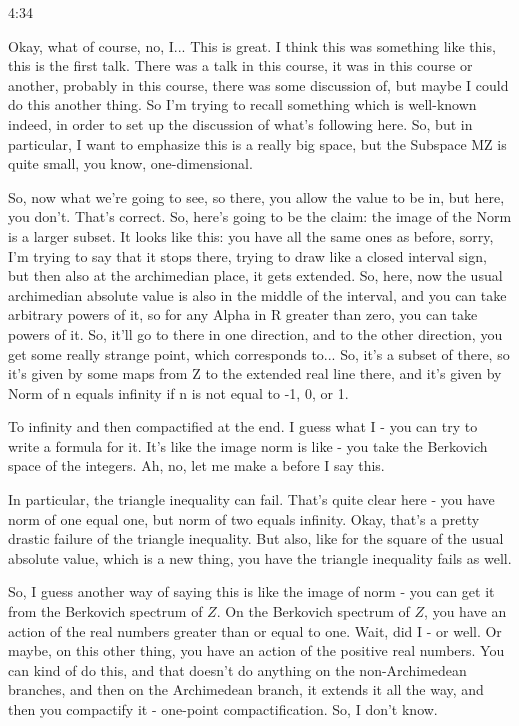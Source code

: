 \begin{unfinished}{4:34}
\begin{example}
Okay, what of course, no, I... This is great. I think this was something like this, this is the first talk. There was a talk in this course, it was in this course or another, probably in this course, there was some discussion of, but maybe I could do this another thing. So I'm trying to recall something which is well-known indeed, in order to set up the discussion of what's following here. So, but in particular, I want to emphasize this is a really big space, but the Subspace MZ is quite small, you know, one-dimensional.

So, now what we're going to see, so there, you allow the value to be in, but here, you don't. That's correct. So, here's going to be the claim: the image of the Norm is a larger subset. It looks like this: you have all the same ones as before, sorry, I'm trying to say that it stops there, trying to draw like a closed interval sign, but then also at the archimedian place, it gets extended. So, here, now the usual archimedian absolute value is also in the middle of the interval, and you can take arbitrary powers of it, so for any Alpha in R greater than zero, you can take powers of it. So, it'll go to there in one direction, and to the other direction, you get some really strange point, which corresponds to... So, it's a subset of there, so it's given by some maps from Z to the extended real line there, and it's given by Norm of n equals infinity if n is not equal to -1, 0, or 1.

To infinity and then compactified at the end. I guess what I - you can try to write a formula for it. It's like the image norm is like - you take the Berkovich space of the integers. Ah, no, let me make a before I say this.

In particular, the triangle inequality can fail. That's quite clear here - you have norm of one equal one, but norm of two equals infinity. Okay, that's a pretty drastic failure of the triangle inequality. But also, like for the square of the usual absolute value, which is a new thing, you have the triangle inequality fails as well.

So, I guess another way of saying this is like the image of norm - you can get it from the Berkovich spectrum of $Z$. On the Berkovich spectrum of $Z$, you have an action of the real numbers greater than or equal to one. Wait, did I - or well. Or maybe, on this other thing, you have an action of the positive real numbers. You can kind of do this, and that doesn't do anything on the non-Archimedean branches, and then on the Archimedean branch, it extends it all the way, and then you compactify it - one-point compactification. So, I don't know.


\end{example}
\end{unfinished}
